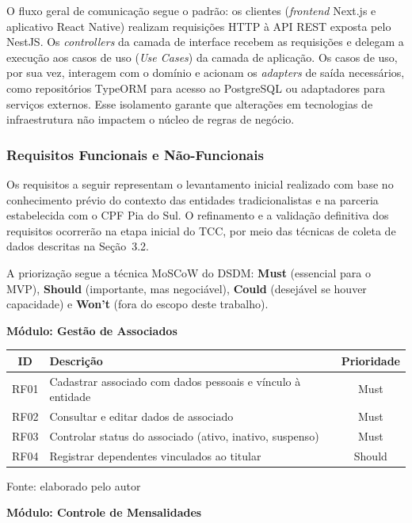 ﻿\documentclass[12pt,a4paper]{article}
\newcommand{\fonte}[1]{\par\vspace{2pt}\footnotesize{Fonte: #1}}
\begin{document}
O fluxo geral de comunicação segue o padrão: os clientes (\textit{frontend} Next.js e aplicativo React Native) realizam requisições HTTP à API REST exposta pelo NestJS. Os \textit{controllers} da camada de interface recebem as requisições e delegam a execução aos casos de uso (\textit{Use Cases}) da camada de aplicação. Os casos de uso, por sua vez, interagem com o domínio e acionam os \textit{adapters} de saída necessários, como repositórios TypeORM para acesso ao PostgreSQL ou adaptadores para serviços externos. Esse isolamento garante que alterações em tecnologias de infraestrutura não impactem o núcleo de regras de negócio.

\subsubsection{Requisitos Funcionais e Não-Funcionais}

Os requisitos a seguir representam o levantamento inicial realizado com base no conhecimento prévio do contexto das entidades tradicionalistas e na parceria estabelecida com o CPF Pia do Sul. O refinamento e a validação definitiva dos requisitos ocorrerão na etapa inicial do TCC, por meio das técnicas de coleta de dados descritas na Seção~3.2.

A priorização segue a técnica MoSCoW do DSDM: \textbf{Must} (essencial para o MVP), \textbf{Should} (importante, mas negociável), \textbf{Could} (desejável se houver capacidade) e \textbf{Won't} (fora do escopo deste trabalho).

\textbf{Módulo: Gestão de Associados}

\begin{center}
\label{tab:rf-associados}
\begin{tabular}{clc}
\hline
\textbf{ID} & \textbf{Descrição} & \textbf{Prioridade} \\
\hline
RF01 & Cadastrar associado com dados pessoais e vínculo à entidade & Must \\
RF02 & Consultar e editar dados de associado & Must \\
RF03 & Controlar status do associado (ativo, inativo, suspenso) & Must \\
RF04 & Registrar dependentes vinculados ao titular & Should \\
\hline
\end{tabular}
\fonte{elaborado pelo autor}
\end{center}

\textbf{Módulo: Controle de Mensalidades}
\end{document}
